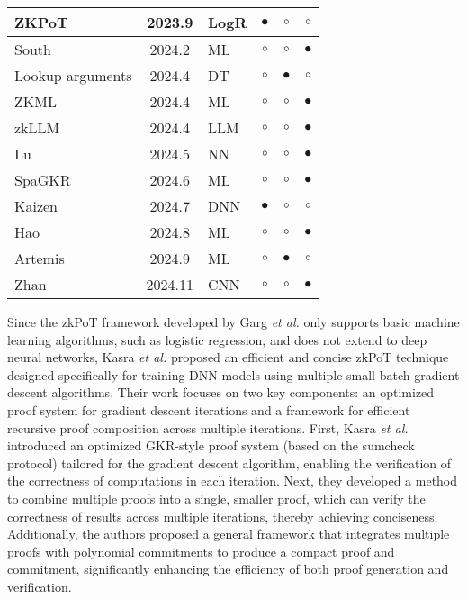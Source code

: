 \documentclass[journal]{IEEEtran}
\begin{document}
\begin{table*}[t]
\begin{tabular}{l c l c c c}
        ZKPoT\cite{garg2023experimenting} & 2023.9 & LogR & $\bullet$  & $\circ$   &  $\circ$  \\ \hline
        South\cite{ganescu2024trust} & 2024.2 & ML & $\circ$    & $\circ$  & $\bullet$  \\ \hline
        Lookup arguments\cite{campanelli2024lookup} & 2024.4 & DT & $\circ$   &  $\bullet$  &  $\circ$   \\ \hline
        ZKML\cite{chen2024zkml} & 2024.4 & ML & $\circ$    & $\circ$   & $\bullet$ \\ \hline
        zkLLM\cite{sun2024zkllm} & 2024.4 & LLM & $\circ$    & $\circ$ & $\bullet$  \\ \hline
        Lu\cite{lu2024efficient} & 2024.5 & NN & $\circ$    & $\circ$   & $\bullet$  \\ \hline
        SpaGKR\cite{li2024sparsity} & 2024.6 & ML & $\circ$     & $\circ$ & $\bullet$   \\ \hline
        Kaizen\cite{abbaszadeh2024zero} & 2024.7 & DNN & $\bullet$  & $\circ$   & $\circ$   \\ \hline
        Hao\cite{hao2024scalable} & 2024.8 & ML & $\circ$   &  $\circ$ & $\bullet$ \\ \hline
        Artemis \cite{lycklama2024artemis}    & 2024.9 & ML & $\circ$  & $\bullet$ &  $\circ$  \\ \hline
        Zhan \cite{zhan2024validating}   & 2024.11 & CNN & $\circ$  & $\circ$  &  $\bullet$  \\ \hline
    \end{tabular}%
    \label{tab3}
\end{table*}



Since the zkPoT framework developed by Garg \emph{et al.} \cite{garg2023experimenting} only supports basic machine learning algorithms, such as logistic regression, and does not extend to deep neural networks, Kasra \emph{et al.} \cite{abbaszadeh2024zero} proposed an efficient and concise zkPoT technique designed specifically for training DNN models using multiple small-batch gradient descent algorithms. Their work focuses on two key components: an optimized proof system for gradient descent iterations and a framework for efficient recursive proof composition across multiple iterations. First, Kasra \emph{et al.} introduced an optimized GKR-style proof system (based on the sumcheck protocol) tailored for the gradient descent algorithm, enabling the verification of the correctness of computations in each iteration. Next, they developed a method to combine multiple proofs into a single, smaller proof, which can verify the correctness of results across multiple iterations, thereby achieving conciseness. Additionally, the authors proposed a general framework that integrates multiple proofs with polynomial commitments to produce a compact proof and commitment, significantly enhancing the efficiency of both proof generation and verification.
\end{document}
